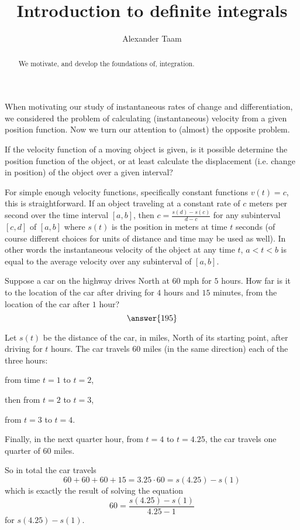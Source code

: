 \documentclass{ximera}
\title{Introduction to definite integrals}
\author{Alexander Taam}
\begin{document}
\begin{abstract}
  We motivate, and develop the foundations of, integration.
\end{abstract}
\maketitle

When motivating our study of instantaneous rates of change and differentiation, we considered the problem of calculating (instantaneous) velocity from a given position function. Now we turn our attention to (almost) the opposite problem. \begin{question}If the velocity function of a moving object is given, is it possible determine the position function of the object, or at least calculate the displacement (i.e. change in position) of the object over a given interval?
\end{question}

For simple enough velocity functions, specifically constant functions $v(t)=c$, this is straightforward. If an object traveling at a constant rate of $c$ meters per second over the time interval $[a,b]$, then $c=\frac{s(d)-s(c)}{d-c}$ for any subinterval $[c,d]$ of $[a,b]$ where $s(t)$ is the position in meters at time $t$ seconds (of course different choices for units of distance and time may be used as well). In other words the instantaneous velocity of the object at any time $t$, $a<t<b$ is equal to the average velocity over any subinterval of $[a,b]$.

\begin{example}
Suppose a car on the highway drives North at $60$ mph for $5$ hours. How far is it to the location of the car after driving for $4$ hours and $15$ minutes, from the location of the car after $1$ hour? \[\answer{195}\]

\begin{feedback} Let $s(t)$ be the distance of the car, in miles, North of its starting point, after driving for $t$ hours. The car travels $60$ miles (in the same direction) each of the three hours: 

from time $t=1$ to $t=2$, 

then from $t=2$ to $t=3$, 

from $t=3$ to $t=4$. 

Finally, in the next quarter hour, from $t=4$ to $t=4.25$, the car travels one quarter of $60$ miles. 

So in total the car travels \[60+60+60+15=3.25\cdot60=s(4.25)-s(1)\] which is exactly the result of solving the equation \[60=\frac{s(4.25)-s(1)}{4.25-1}\] for $s(4.25)-s(1)$.
\end{feedback}
\end{example}
\end{document}
